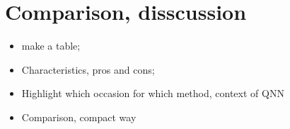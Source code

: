 












% 

% 

% 

\section{Comparison, disscussion}
\begin{itemize}
    \item make a table;
    \item Characteristics, pros and cons;
    \item Highlight which occasion for which method, context of QNN
    \item Comparison, compact way
\end{itemize}



